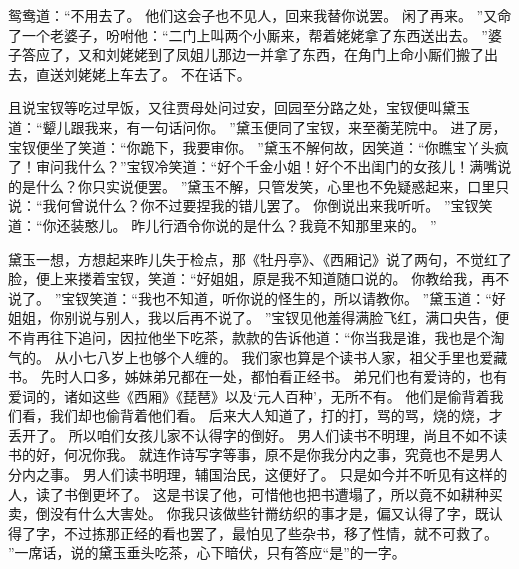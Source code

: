 鸳鸯道：“不用去了。
他们这会子也不见人，回来我替你说罢。
闲了再来。
”又命了一个老婆子，吩咐他：“二门上叫两个小厮来，帮着姥姥拿了东西送出去。
”婆子答应了，又和刘姥姥到了凤姐儿那边一并拿了东西，在角门上命小厮们搬了出去，直送刘姥姥上车去了。
不在话下。
\par
且说宝钗等吃过早饭，又往贾母处问过安，回园至分路之处，宝钗便叫黛玉道：“颦儿跟我来，有一句话问你。
”黛玉便同了宝钗，来至蘅芜院中。
进了房，宝钗便坐了笑道：“你跪下，我要审你。
”黛玉不解何故，因笑道：“你瞧宝丫头疯了！审问我什么？”宝钗冷笑道：“好个千金小姐！好个不出闺门的女孩儿！满嘴说的是什么？你只实说便罢。
”黛玉不解，只管发笑，心里也不免疑惑起来，口里只说：“我何曾说什么？你不过要捏我的错儿罢了。
你倒说出来我听听。
”宝钗笑道：“你还装憨儿。
昨儿行酒令你说的是什么？我竟不知那里来的。
”\par
黛玉一想，方想起来昨儿失于检点，那《牡丹亭》、《西厢记》说了两句，不觉红了脸，便上来搂着宝钗，笑道：“好姐姐，原是我不知道随口说的。
你教给我，再不说了。
”宝钗笑道：“我也不知道，听你说的怪生的，所以请教你。
”黛玉道：“好姐姐，你别说与别人，我以后再不说了。
”宝钗见他羞得满脸飞红，满口央告，便不肯再往下追问，因拉他坐下吃茶，款款的告诉他道：“你当我是谁，我也是个淘气的。
从小七八岁上也够个人缠的。
我们家也算是个读书人家，祖父手里也爱藏书。
先时人口多，姊妹弟兄都在一处，都怕看正经书。
弟兄们也有爱诗的，也有爱词的，诸如这些《西厢》《琵琶》以及‘元人百种’，无所不有。
他们是偷背着我们看，我们却也偷背着他们看。
后来大人知道了，打的打，骂的骂，烧的烧，才丢开了。
所以咱们女孩儿家不认得字的倒好。
男人们读书不明理，尚且不如不读书的好，何况你我。
就连作诗写字等事，原不是你我分内之事，究竟也不是男人分内之事。
男人们读书明理，辅国治民，这便好了。
只是如今并不听见有这样的人，读了书倒更坏了。
这是书误了他，可惜他也把书遭塌了，所以竟不如耕种买卖，倒没有什么大害处。
你我只该做些针黹纺织的事才是，偏又认得了字，既认得了字，不过拣那正经的看也罢了，最怕见了些杂书，移了性情，就不可救了。
”一席话，说的黛玉垂头吃茶，心下暗伏，只有答应“是”的一字。
\par

